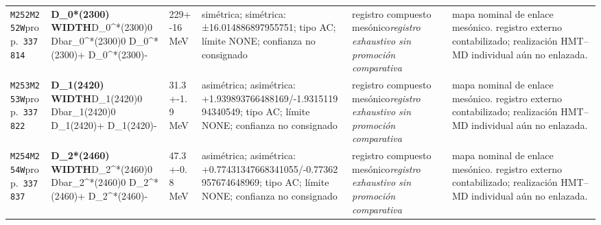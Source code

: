 \begin{landscape}
\begin{longtable}{L{1.85cm}L{4.45cm}L{2.35cm}L{4.05cm}L{3.35cm}L{7.15cm}}
\texttt{M252}\newline \texttt{M252W}\newline prop.\ \texttt{337814} & \textbf{D\_\allowbreak{}0*(2300) WIDTH}\newline D\_\allowbreak{}0\textasciicircum{}*(2300)0 \textbar{}\allowbreak{} Dbar\_\allowbreak{}0\textasciicircum{}*(2300)0 \textbar{}\allowbreak{} D\_\allowbreak{}0\textasciicircum{}*(2300)+ \textbar{}\allowbreak{} D\_\allowbreak{}0\textasciicircum{}*(2300)- & 229+-16\,MeV & simétrica; simétrica: ±16.014886897955751; tipo AC; límite NONE; confianza no consignado & registro compuesto mesónico\newline \emph{registro exhaustivo sin promoción comparativa} & mapa nominal de enlace mesónico. registro externo contabilizado; realización HMT--MD individual aún no enlazada. \\
\texttt{M253}\newline \texttt{M253W}\newline prop.\ \texttt{337822} & \textbf{D\_\allowbreak{}1(2420) WIDTH}\newline D\_\allowbreak{}1(2420)0 \textbar{}\allowbreak{} Dbar\_\allowbreak{}1(2420)0 \textbar{}\allowbreak{} D\_\allowbreak{}1(2420)+ \textbar{}\allowbreak{} D\_\allowbreak{}1(2420)- & 31.3+-1.9\,MeV & asimétrica; asimétrica: +1.939893766488169/-1.931511994340549; tipo AC; límite NONE; confianza no consignado & registro compuesto mesónico\newline \emph{registro exhaustivo sin promoción comparativa} & mapa nominal de enlace mesónico. registro externo contabilizado; realización HMT--MD individual aún no enlazada. \\
\texttt{M254}\newline \texttt{M254W}\newline prop.\ \texttt{337837} & \textbf{D\_\allowbreak{}2*(2460) WIDTH}\newline D\_\allowbreak{}2\textasciicircum{}*(2460)0 \textbar{}\allowbreak{} Dbar\_\allowbreak{}2\textasciicircum{}*(2460)0 \textbar{}\allowbreak{} D\_\allowbreak{}2\textasciicircum{}*(2460)+ \textbar{}\allowbreak{} D\_\allowbreak{}2\textasciicircum{}*(2460)- & 47.3+-0.8\,MeV & asimétrica; asimétrica: +0.77431347668341055/-0.77362957674648969; tipo AC; límite NONE; confianza no consignado & registro compuesto mesónico\newline \emph{registro exhaustivo sin promoción comparativa} & mapa nominal de enlace mesónico. registro externo contabilizado; realización HMT--MD individual aún no enlazada. \\

\end{longtable}
\end{landscape}
